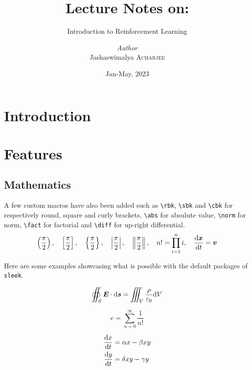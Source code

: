\documentclass[a4paper, 12pt]{report}
\institute{Indian Institute of Technology Madras}
\title{Lecture Notes on:}
\subtitle{Introduction to Reinforcement Learning}
\author{\textit{Author}\\Jashaswimalya \textsc{Acharjee}}
\date{Jan-May, 2023}
\def\tbs{\textbackslash}
\begin{document}
    \maketitle
    \romantableofcontents

    \chapter{Introduction}
    
    
    
    
    
    \chapter{Features}

    \section{Mathematics}

    A few custom macros have also been added such as \texttt{\tbs{}rbk}, \texttt{\tbs{}sbk} and \texttt{\tbs{}cbk} for respectively round, square and curly brackets, \texttt{\tbs{}abs} for absulute value, \texttt{\tbs{}norm} for norm, \texttt{\tbs{}fact} for factorial and \texttt{\tbs{}diff} for up-right differential.
    $$
        \left(\frac{\pi}{2}\right), \quad \left[\frac{\pi}{2}\right], \quad \left\{\frac{\pi}{2}\right\}, \quad \left|\frac{\pi}{2}\right|, \quad \left\|\frac{\pi}{2}\right\|, \quad n! = \prod_{i = 1}^{n} i, \quad \frac{\mathrm{d} \bm{x}}{\mathrm{d} t} = \bm{v}
    $$

    Here are some examples showcasing what is possible with the default packages of \texttt{sleek}.

    \begin{equation}\label{eq:gauss_law}
        \oiint_S \bm{E} \cdot \mathrm{d} \bm{s} = \iiint_V \frac{\rho}{\varepsilon_0} \mathrm{d} V
    \end{equation}

    \begin{equation*}
        e = \sum_{n=0}^\infty \frac{1}{n!}
    \end{equation*}

    \begin{subequations}
        \begin{align}
            \frac{\mathrm{d} x}{\mathrm{d} t} & = \alpha x - \beta xy \\
            \frac{\mathrm{d} y}{\mathrm{d} t} & = \delta xy - \gamma y
        \end{align}
    \end{subequations}
\end{document}
